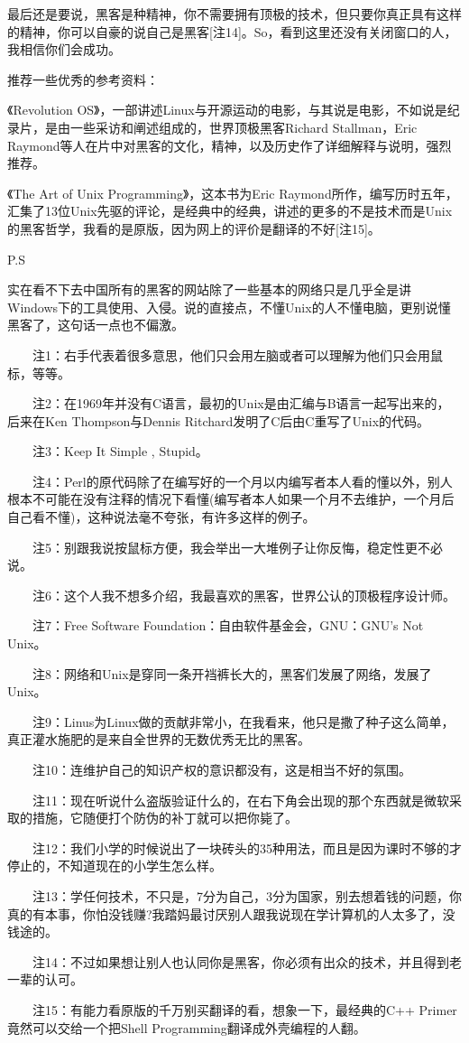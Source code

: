 \documentclass[12pt,a4paper]{article}
\begin{document}
\begin{CJK}{UTF8}{gbsn}
最后还是要说，黑客是种精神，你不需要拥有顶极的技术，但只要你真正具有这样的精神，你可以自豪的说自己是黑客[注14]。So，看到这里还没有关闭窗口的人，我相信你们会成功。

推荐一些优秀的参考资料：

《Revolution OS》，一部讲述Linux与开源运动的电影，与其说是电影，不如说是纪录片，是由一些采访和阐述组成的，世界顶极黑客Richard Stallman，Eric Raymond等人在片中对黑客的文化，精神，以及历史作了详细解释与说明，强烈推荐。

《The Art of Unix Programming》，这本书为Eric Raymond所作，编写历时五年，汇集了13位Unix先驱的评论，是经典中的经典，讲述的更多的不是技术而是Unix的黑客哲学，我看的是原版，因为网上的评价是翻译的不好[注15]。

\begin{LARGE}
P.S
\end{LARGE}

实在看不下去中国所有的黑客的网站除了一些基本的网络只是几乎全是讲Windows下的工具使用、入侵。说的直接点，不懂Unix的人不懂电脑，更别说懂黑客了，这句话一点也不偏激。

　　注1：右手代表着很多意思，他们只会用左脑或者可以理解为他们只会用鼠标，等等。

　　注2：在1969年并没有C语言，最初的Unix是由汇编与B语言一起写出来的，后来在Ken Thompson与Dennis Ritchard发明了C后由C重写了Unix的代码。

　　注3：Keep It Simple , Stupid。

　　注4：Perl的原代码除了在编写好的一个月以内编写者本人看的懂以外，别人根本不可能在没有注释的情况下看懂(编写者本人如果一个月不去维护，一个月后自己看不懂)，这种说法毫不夸张，有许多这样的例子。

　　注5：别跟我说按鼠标方便，我会举出一大堆例子让你反悔，稳定性更不必说。

　　注6：这个人我不想多介绍，我最喜欢的黑客，世界公认的顶极程序设计师。

　　注7：Free Software Foundation：自由软件基金会，GNU：GNU's Not Unix。

　　注8：网络和Unix是穿同一条开裆裤长大的，黑客们发展了网络，发展了Unix。

　　注9：Linus为Linux做的贡献非常小，在我看来，他只是撒了种子这么简单，真正灌水施肥的是来自全世界的无数优秀无比的黑客。

　　注10：连维护自己的知识产权的意识都没有，这是相当不好的氛围。

　　注11：现在听说什么盗版验证什么的，在右下角会出现的那个东西就是微软采取的措施，它随便打个防伪的补丁就可以把你毙了。

　　注12：我们小学的时候说出了一块砖头的35种用法，而且是因为课时不够的才停止的，不知道现在的小学生怎么样。

　　注13：学任何技术，不只是，7分为自己，3分为国家，别去想着钱的问题，你真的有本事，你怕没钱赚?我踏妈最讨厌别人跟我说现在学计算机的人太多了，没钱途的。

　　注14：不过如果想让别人也认同你是黑客，你必须有出众的技术，并且得到老一辈的认可。

　　注15：有能力看原版的千万别买翻译的看，想象一下，最经典的C++ Primer竟然可以交给一个把Shell Programming翻译成外壳编程的人翻。







\end{CJK}
\end{document}
